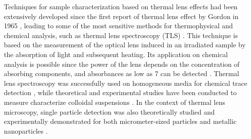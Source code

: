 \documentclass[9pt,twocolumn,twoside]{osajnl}
\begin{document}
Techniques for sample characterization based on thermal lens effects had been extensively developed since the first report of thermal lens effect by Gordon in 1965 \cite{Gordon1965}, leading to some of the most sensitive methods for thermophysical and chemical analysis, such as thermal lens spectroscopy (TLS) \cite{Franko2010,Liu2016}. This technique is based on the measurement of the optical lens induced in an irradiated sample by the absorption of light and subsequent heating. Its application on chemical analysis is possible since the power of the lens depends on the concentration of absorbing components, and absorbances as low as \SI{7}{\arb} can be detected \cite{Proskurnin2015}. Thermal lens spectroscopy was successfully used on homogeneous media for chemical trace detection \cite{Sikovec1996,Franko2010}, while theoretical and experimental studies have been conducted to measure characterize colloidal suspensions \cite{Brusnichkin2007,Marcano2011,Rusconi2004}. In the context of thermal lens microscopy, single particle detection was also theoretically studied \cite{Selmke2015} and experimentally demonstrated for both micrometer-sized particles \cite{Harada1995,Andika2010} and metallic nanoparticles \cite{Berciaud2005,Gaiduk2010}.
\end{document}
